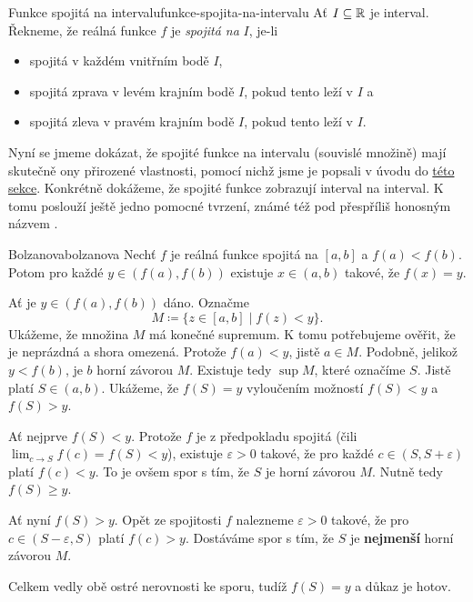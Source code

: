 \begin{definition}{Funkce spojitá na intervalu}{funkce-spojita-na-intervalu}
 Ať $I \subseteq \mathbb{R}$ je interval. Řekneme, že reálná funkce $f$ je
 \emph{spojitá na} $I$, je-li
 \begin{itemize}
  \item spojitá v každém vnitřním bodě $I$,
  \item spojitá zprava v levém krajním bodě $I$, pokud tento leží v $I$ a
  \item spojitá zleva v pravém krajním bodě $I$, pokud tento leží v $I$.
 \end{itemize}
\end{definition}

Nyní se jmeme dokázat, že spojité funkce na intervalu (souvislé množině) mají
skutečně ony přirozené vlastnosti, pomocí nichž jsme je popsali v úvodu do
\hyperref[sec:spojite-funkce]{této sekce}. Konkrétně dokážeme, že spojité funkce
zobrazují interval na interval. K tomu poslouží ještě jedno pomocné tvrzení,
známé též pod přespříliš honosným názvem .

\begin{theorem}{Bolzanova}{bolzanova}
 Nechť $f$ je reálná funkce spojitá na $[a,b]$ a $f(a) < f(b)$. Potom pro každé
 $y \in (f(a),f(b))$ existuje $x \in (a,b)$ takové, že $f(x) = y$.
\end{theorem}
\begin{thmproof}
 Ať je $y \in (f(a),f(b))$ dáno. Označme
 \[
  M \coloneqq \{z \in [a,b] \mid f(z) < y\}.
 \]
 Ukážeme, že množina $M$ má konečné supremum. K tomu potřebujeme ověřit, že je
 neprázdná a shora omezená. Protože $f(a) < y$, jistě $a \in M$. Podobně,
 jelikož $y < f(b)$, je $b$ horní závorou $M$. Existuje tedy $\sup M$, které
 označíme $S$. Jistě platí $S \in (a,b)$. Ukážeme, že $f(S) = y$ vyloučením
 možností $f(S) < y$ a $f(S) > y$.

 Ať nejprve $f(S) < y$. Protože $f$ je z předpokladu spojitá (čili $\lim_{c \to
 S} f(c) = f(S) < y$), existuje $\varepsilon>0$ takové, že pro každé $c \in
 (S,S+\varepsilon)$ platí $f(c) < y$. To je ovšem spor s tím, že $S$ je horní
 závorou $M$. Nutně tedy $f(S) \geq y$.

 Ať nyní $f(S) > y$. Opět ze spojitosti $f$ nalezneme $\varepsilon>0$ takové, že
 pro $c \in (S-\varepsilon,S)$ platí $f(c) > y$. Dostáváme spor s tím, že $S$ je
 \textbf{nejmenší} horní závorou $M$.

 Celkem vedly obě ostré nerovnosti ke sporu, tudíž $f(S) = y$ a důkaz je hotov.
\end{thmproof}

